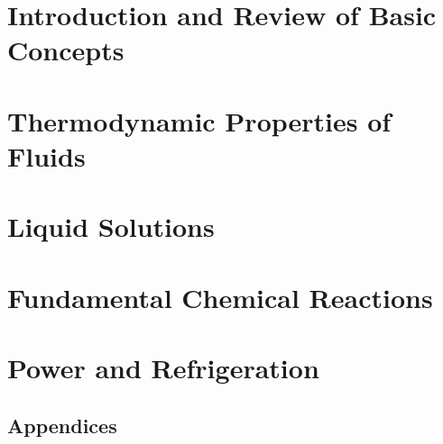 \documentclass[11pts,a4paper,amsmath,amssymb,floatfix]{book}
\theoremstyle{definition}
\begin{document}
\setcounter{page}{1}

\tableofcontents
\vfill

\pagebreak
\listoftables
\vfill
\pagebreak
\listoffigures
\vfill
\pagebreak



\part{Introduction and Review of Basic Concepts}


\part{Thermodynamic Properties of Fluids}  


\part{Liquid Solutions}


\part{Fundamental Chemical Reactions}


\part{Power and Refrigeration}

\pagebreak

\cleardoublepage

  \begin{appendix}
\part{Appendices}
     
     
      
        
     
     
  \end{appendix}

\cleardoublepage

\pagebreak

%



\cleardoublepage
{}
\renewcommand\leftmark{}
\renewcommand\rightmark{Index}

\printindex
\end{document}
